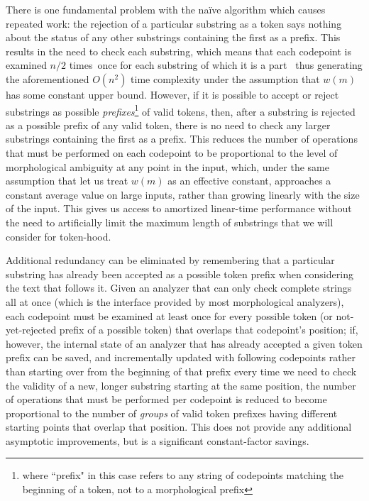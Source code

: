 There is one fundamental problem with the naïve algorithm which causes repeated work: the rejection of a particular substring as a token says nothing about the status of any other substrings containing the first as a prefix. This results in the need to check each substring, which means that each codepoint is examined $n/2$ times\textemdash~once for each substring of which it is a part\textemdash~ thus generating the aforementioned $O(n^{2})$ time complexity under the assumption that $w(m)$ has some constant upper bound. However, if it is possible to accept or reject substrings as possible \textit{prefixes}\footnote{where ``prefix" in this case refers to any string of codepoints matching the beginning of a token, not to a morphological prefix} of valid tokens, then, after a substring is rejected as a possible prefix of any valid token, there is no need to check any larger substrings containing the first as a prefix. This reduces the number of operations that must be performed on each codepoint to be proportional to the level of morphological ambiguity at any point in the input, which, under the same assumption that let us treat $w(m)$ as an effective constant, approaches a constant average value on large inputs, rather than growing linearly with the size of the input. This gives us access to amortized linear-time performance without the need to artificially limit the maximum length of substrings that we will consider for token-hood.

Additional redundancy can be eliminated by remembering that a particular substring has already been accepted as a possible token prefix when considering the text that follows it. Given an analyzer that can only check complete strings all at once (which is the interface provided by most morphological analyzers), each codepoint must be examined at least once for every possible token (or not-yet-rejected prefix of a possible token) that overlaps that codepoint's position; if, however, the internal state of an analyzer that has already accepted a given token prefix can be saved, and incrementally updated with following codepoints rather than starting over from the beginning of that prefix every time we need to check the validity of a new, longer substring starting at the same position, the number of operations that must be performed per codepoint is reduced to become proportional to the number of \textit{groups} of valid token prefixes having different starting points that overlap that position. This does not provide any additional asymptotic improvements, but is a significant constant-factor savings.

